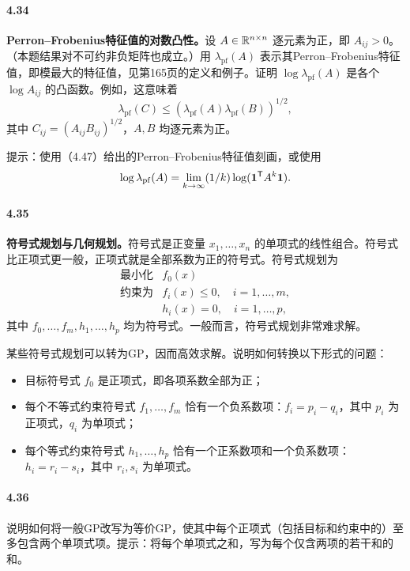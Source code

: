 \paragraph{4.34}\textbf{Perron--Frobenius特征值的对数凸性。}设 $A\in\mathbb R^{n\times n}$ 逐元素为正，即 $A_{ij}>0$。（本题结果对不可约非负矩阵也成立。）用 $\lambda_{\mathrm{pf}}(A)$ 表示其Perron--Frobenius特征值，即模最大的特征值，见第165页的定义和例子。证明 $\log\lambda_{\mathrm{pf}}(A)$ 是各个 $\log A_{ij}$ 的凸函数。例如，这意味着
\[
\lambda_{\mathrm{pf}}(C)\le(\lambda_{\mathrm{pf}}(A)\lambda_{\mathrm{pf}}(B))^{1/2},
\]
其中 $C_{ij}=(A_{ij}B_{ij})^{1/2}$，$A,B$ 均逐元素为正。

提示：使用（4.47）给出的Perron--Frobenius特征值刻画，或使用
\[
\log\lambda_{\mathrm{pf}}(A)=\lim_{k\to\infty}(1/k)\log(\mathbf 1^\mathsf T A^k\mathbf 1).
\]

\paragraph{4.35}\textbf{符号式规划与几何规划。}符号式是正变量 $x_1,\ldots,x_n$ 的单项式的线性组合。符号式比正项式更一般，正项式就是全部系数为正的符号式。符号式规划为
\[
\begin{array}{ll}\text{最小化}&f_0(x)\\\text{约束为}&f_i(x)\le0,\quad i=1,\ldots,m,\\&h_i(x)=0,\quad i=1,\ldots,p,\end{array}
\]
其中 $f_0,\ldots,f_m,h_1,\ldots,h_p$ 均为符号式。一般而言，符号式规划非常难求解。

某些符号式规划可以转为GP，因而高效求解。说明如何转换以下形式的问题：
\begin{itemize}
\item 目标符号式 $f_0$ 是正项式，即各项系数全部为正；
\item 每个不等式约束符号式 $f_1,\ldots,f_m$ 恰有一个负系数项：$f_i=p_i-q_i$，其中 $p_i$ 为正项式，$q_i$ 为单项式；
\item 每个等式约束符号式 $h_1,\ldots,h_p$ 恰有一个正系数项和一个负系数项：$h_i=r_i-s_i$，其中 $r_i,s_i$ 为单项式。
\end{itemize}

\paragraph{4.36}说明如何将一般GP改写为等价GP，使其中每个正项式（包括目标和约束中的）至多包含两个单项式项。提示：将每个单项式之和，写为每个仅含两项的若干和的和。

